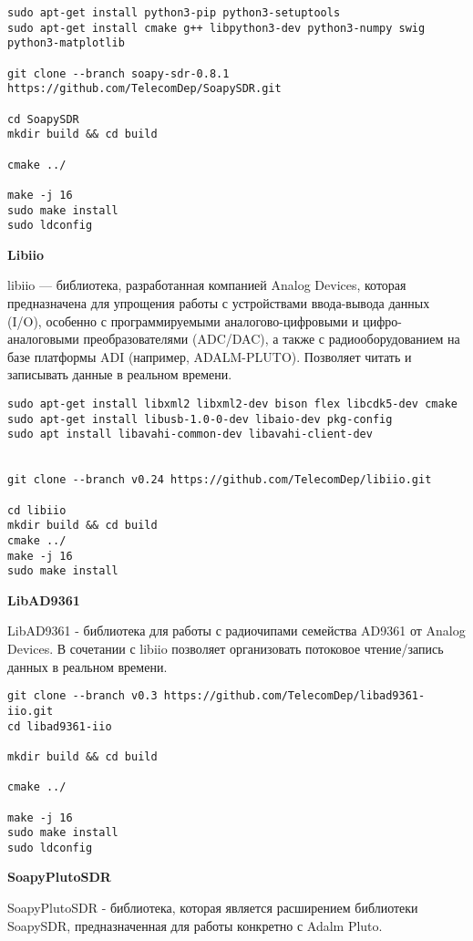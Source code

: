 \begin{lstlisting}
sudo apt-get install python3-pip python3-setuptools
sudo apt-get install cmake g++ libpython3-dev python3-numpy swig python3-matplotlib

git clone --branch soapy-sdr-0.8.1 https://github.com/TelecomDep/SoapySDR.git

cd SoapySDR
mkdir build && cd build

cmake ../

make -j 16
sudo make install
sudo ldconfig
\end{lstlisting}

\textbf{Libiio}

libiio — библиотека, разработанная компанией Analog Devices, которая предназначена для упрощения работы с устройствами ввода-вывода
данных (I/O), особенно с программируемыми аналогово-цифровыми и цифро-аналоговыми преобразователями (ADC/DAC), а также с 
радиооборудованием на базе платформы ADI (например, ADALM-PLUTO). Позволяет читать и записывать данные в реальном времени.

\begin{lstlisting}
sudo apt-get install libxml2 libxml2-dev bison flex libcdk5-dev cmake
sudo apt-get install libusb-1.0-0-dev libaio-dev pkg-config 
sudo apt install libavahi-common-dev libavahi-client-dev


git clone --branch v0.24 https://github.com/TelecomDep/libiio.git

cd libiio
mkdir build && cd build
cmake ../
make -j 16
sudo make install
\end{lstlisting}

\textbf{LibAD9361}

LibAD9361 - библиотека для работы с радиочипами семейства AD9361 от Analog Devices. В сочетании с libiio позволяет организовать 
потоковое чтение/запись данных в реальном времени.

\begin{lstlisting}
git clone --branch v0.3 https://github.com/TelecomDep/libad9361-iio.git
cd libad9361-iio

mkdir build && cd build

cmake ../

make -j 16
sudo make install
sudo ldconfig
\end{lstlisting}

\textbf{SoapyPlutoSDR}

SoapyPlutoSDR - библиотека, которая является расширением библиотеки SoapySDR, предназначенная для работы конкретно с Adalm Pluto. 

